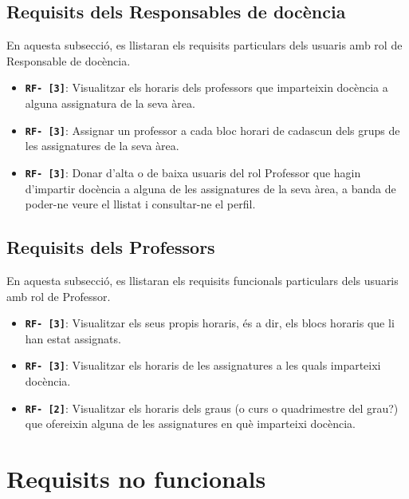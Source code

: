 \documentclass[a4paper,12pt]{ThesisStyle}
\begin{document}
\subsection{Requisits dels Responsables de docència} %
\label{subsec:requisits_responsables_docencia}

En aquesta subsecció, es llistaran els requisits particulars dels usuaris amb rol de Responsable de docència.

\begin{itemize} %
  \item \texttt{\textbf{RF- [3]}}: Visualitzar els horaris dels professors que imparteixin docència a alguna assignatura de la seva àrea.
  \item \texttt{\textbf{RF- [3]}}: Assignar un professor a cada bloc horari de cadascun dels grups de les assignatures de la seva àrea.
  \item \texttt{\textbf{RF- [3]}}: Donar d'alta o de baixa usuaris del rol Professor que hagin d'impartir docència a alguna de les assignatures de la seva àrea, a banda de poder-ne veure el llistat i consultar-ne el perfil.
\end{itemize}

\subsection{Requisits dels Professors}
\label{subsec:requisits_professors}

En aquesta subsecció, es llistaran els requisits funcionals particulars dels usuaris amb rol de Professor.

\begin{itemize} %
  \item \texttt{\textbf{RF- [3]}}: Visualitzar els seus propis horaris, és a dir, els blocs horaris que li han estat assignats.
  \item \texttt{\textbf{RF- [3]}}: Visualitzar els horaris de les assignatures a les quals imparteixi docència.
  \item \texttt{\textbf{RF- [2]}}: Visualitzar els horaris dels graus (o curs o quadrimestre del grau?) que ofereixin alguna de les assignatures en què imparteixi docència.
\end{itemize}

\section{Requisits no funcionals}
\label{sec:requisits_no_funcionals}
\end{document}
